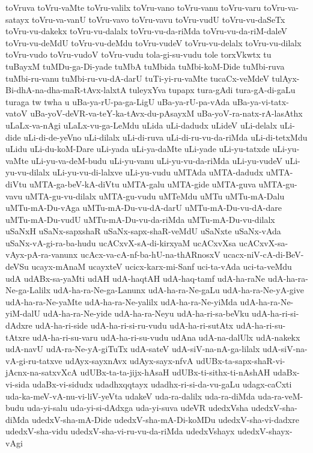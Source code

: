 {toVruva
toVru-vaMte
toVru-valilx
toVru-vano
toVru-vanu
toVru-varu
toVru-va-satayx
toVru-va-vanU
toVru-vavo
toVru-vavu
toVru-vudU
toVru-vu-daSeTx
toVru-vu-dakekx
toVru-vu-dalalx
toVru-vu-da-riMda
toVru-vu-da-riM-daleV
toVru-vu-deMdU
toVru-vu-deMdu
toVru-vudeV
toVru-vu-delalx
toVru-vu-dilalx
toVru-vudo
toVru-vudoV
toVru-vudu
tola-gi-su-vudu
tole
torxVkwtx
tu
tuBayxM
tuMDu-ga-Di-yade
tuMbA
tuMbida
tuMbi-koM-Dide
tuMbi-ruva
tuMbi-ru-vanu
tuMbi-ru-vu-dA-darU
tuTi-yi-ru-vaMte
tucaCx-veMdeV
tulAyx-Bi-dhA-na-dha-maR-tAvx-lalxtA
tuleyxYva
tupapx
tura-gAdi
tura-gA-di-gaLu
turaga
tw
twha
u
uBa-ya-rU-pa-ga-LigU
uBa-ya-rU-pa-vAda
uBa-ya-vi-tatx-vatoV
uBa-yoV-deVR-va-teY-ka-tAvx-du-pAsayxM
uBa-yoV-ra-natx-rA-lasAthx
uLaLx-va-nAgi
uLaLx-vu-ga-LeMdu
uLida
uLi-dadudx
uLideV
uLi-delalx
uLi-dide
uLi-di-de-yeVno
uLi-dilalx
uLi-di-ruva
uLi-di-ru-vu-da-riMda
uLi-di-tetxMdu
uLidu
uLi-du-koM-Dare
uLi-yada
uLi-ya-daMte
uLi-yade
uLi-yu-tatxde
uLi-yu-vaMte
uLi-yu-va-deM-budu
uLi-yu-vanu
uLi-yu-vu-da-riMda
uLi-yu-vudeV
uLi-yu-vu-dilalx
uLi-yu-vu-di-lalxve
uLi-yu-vudu
uMTAda
uMTA-dadudx
uMTA-diVtu
uMTA-ga-beV-kA-diVtu
uMTA-galu
uMTA-gide
uMTA-guva
uMTA-gu-vavu
uMTA-gu-vu-dilalx
uMTA-gu-vudu
uMTeMdu
uMTu
uMTu-mA-Dalu
uMTu-mA-Du-vAga
uMTu-mA-Du-vu-dA-darU
uMTu-mA-Du-vu-dA-dare
uMTu-mA-Du-vudU
uMTu-mA-Du-vu-da-riMda
uMTu-mA-Du-vu-dilalx
uSaNxH
uSaNx-sapxshaR
uSaNx-sapx-shaR-veMdU
uSaNxte
uSaNx-vAda
uSaNx-vA-gi-ra-ba-hudu
ucACxvX-sA-di-kirxyaM
ucACxvXsa
ucACxvX-sa-vAyx-pA-ra-vanunx
ucAcx-va-cA-nf-ba-hU-na-thARnosxV
ucacx-niV-cA-di-BeV-deVSu
ucayx-mAnaM
ucayxteV
ucicx-karx-mi-Sanf
uci-ta-vAda
uci-ta-veMdu
udA
udABx-sa-yaMti
udAH
udA-haqtAH
udA-haq-tamf
udA-ha-raNe
udA-ha-ra-Ne-ga-Lalilx
udA-ha-ra-Ne-ga-Lanunx
udA-ha-ra-Ne-gaLu
udA-ha-ra-Ne-yA-give
udA-ha-ra-Ne-yaMte
udA-ha-ra-Ne-yalilx
udA-ha-ra-Ne-yiMda
udA-ha-ra-Ne-yiM-dalU
udA-ha-ra-Ne-yide
udA-ha-ra-Neyu
udA-ha-ri-sa-beVku
udA-ha-ri-si-dAdxre
udA-ha-ri-side
udA-ha-ri-si-ru-vudu
udA-ha-ri-sutAtx
udA-ha-ri-su-tAtxre
udA-ha-ri-su-varu
udA-ha-ri-su-vudu
udAna
udA-na-dalUlx
udA-nakekx
udA-navU
udA-ra-Ne-yA-giTuTx
udA-sateV
udA-siV-na-nA-ga-lilalx
udA-siV-na-vA-gi-ru-tatxve
udAyx-sayxnAvx
udAyx-sayx-nfvA
udUBx-ta-sapx-shaR-vi-jAcnx-na-satxvXcA
udUBx-ta-ta-jijx-hAsaH
udUBx-ti-sithx-ti-nAshAH
udaBx-vi-sida
udaBx-vi-sidudx
udadhxqqtayx
udadhx-ri-si-da-vu-gaLu
udagx-caCxti
uda-ka-meV-vA-nu-vi-liV-yeVta
udakeV
uda-ra-dalilx
uda-ra-diMda
uda-ra-veM-budu
uda-yi-salu
uda-yi-si-dAdxga
uda-yi-suva
udeVR
udedxVsha
udedxV-sha-diMda
udedxV-sha-mA-Dide
udedxV-sha-mA-Di-koMDu
udedxV-sha-vi-dadxre
udedxV-sha-vidu
udedxV-sha-vi-ru-vu-da-riMda
udedxVshayx
udedxV-shayx-vAgi
}
